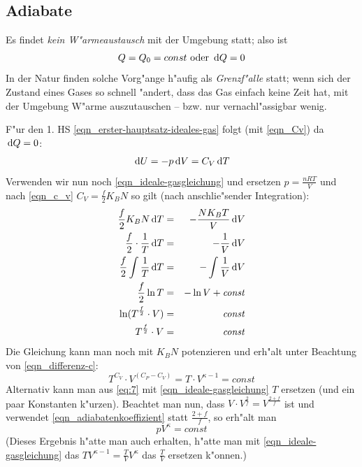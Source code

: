 \subsection{Adiabate}
\label{kap_adiabate}

Es findet \emph{kein W"armeaustausch} mit der Umgebung statt; also
ist 
$$
Q = Q_0 = const \text{ oder } {\ensuremath{\, \mathrm{d}}Q = 0}
$$
In der Natur finden solche Vorg"ange h"aufig als \emph{Grenzf"alle}
statt; wenn sich der Zustand eines Gases so schnell "andert, dass das
Gas einfach keine Zeit hat, mit der Umgebung W"arme auszutauschen --
bzw. nur vernachl"assigbar wenig.

F"ur den 1. HS \eqref{eqn_erster-hauptsatz-ideales-gas} folgt (mit
\ref{eqn_Cv}) da $\, \mathrm{d} Q = 0$:
\begin{equation}
   \label{eq:1}
   \, \mathrm{d} U = - p \, \mathrm{d} V = C_V \, \mathrm{d} T
\end{equation}
Verwenden wir nun noch \eqref{eqn_ideale-gasgleichung} und ersetzen $p
= \frac{nRT}{V}$ und nach \eqref{eqn_c_v} $C_V = \frac{f}{2} K_BN$ so
gilt (nach anschlie"sender Integration):
\begin{eqnarray}
\nonumber
\frac{f}{2} K_B N \, \mathrm{d} T &=& - \frac{NK_BT}{V} \, \mathrm{d} V   \\
\nonumber
\frac{f}{2}  \cdot \frac{1}{T} \, \mathrm{d} T &=& -   \frac{1}{V}
\, \mathrm{d} V   \\
\nonumber
\frac{f}{2}  \int \frac{1}{T} \, \mathrm{d} T &=& - \int \frac{1}{V}
\, \mathrm{d} V  \\
\nonumber
\frac{f}{2} \ln T &=& - \ln V + \text{\emph{const}} \\
\nonumber
\ln (  T^{ \frac{f}{2} } \cdot V ) &=& \text{\emph{const}} \\
\label{eq:7}
T^{ \frac{f}{2} } \cdot V  &=& \text{\emph{const}} 
\end{eqnarray}
Die Gleichung kann man noch mit $K_BN$ potenzieren und erh"alt unter
Beachtung von \eqref{eqn_differenz-c}:
\begin{equation}
   \label{eq:6}
   T^{ C_V } \cdot V^{ (C_P - C_V) }  = \boxed {T\cdot V^{ \kappa - 1
     }= const }
\end{equation}
Alternativ kann man aus \eqref{eq:7} mit \eqref{eqn_ideale-gasgleichung} $T$
ersetzen
(und ein paar Konstanten k"urzen). Beachtet man nun, dass $V\cdot V^{
  \frac{2}{f}} = V^{ \frac{2+f}{f} }$ ist und verwendet
\eqref{eqn_adiabatenkoeffizient} statt $\frac{2+f}{f}$, so erh"alt man
\begin{equation}
   \label{eq:9}
\boxed{
   pV^\kappa = const
}
\end{equation}
(Dieses Ergebnis h"atte man auch erhalten, h"atte man mit
\eqref{eqn_ideale-gasgleichung} das $TV^{\kappa-1 } =
\frac{T}{V}V^\kappa$ das $\frac{T}{V}$ ersetzen k"onnen.)




